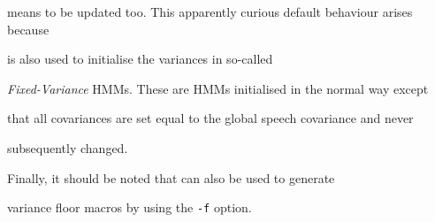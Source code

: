 means to be updated too.  This apparently curious default behaviour arises because


 is also used to initialise the variances in so-called


\textit{Fixed-Variance} HMMs. These are HMMs initialised in the normal way except


that all covariances are set equal to the global speech covariance and never


subsequently changed.





Finally, it should be noted that  can also be used to generate 


variance floor macros by using the \texttt{-f} option.












